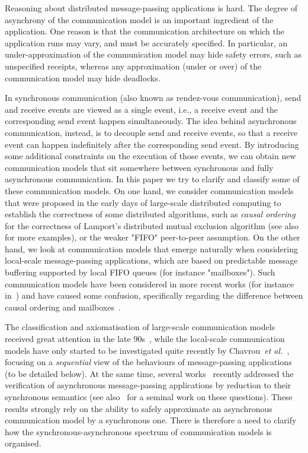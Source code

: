 

Reasoning about distributed message-passing applications is  hard. The degree of asynchrony
of the communication model is  an important ingredient of the application.
One reason
is that the communication architecture on which the application runs may vary, and must be accurately specified. 
In particular, an under-approximation of the communication model may hide safety errors,
such as unspecified receipts, whereas any approximation (under or over) of the communication model may hide deadlocks. 

In synchronous communication (also known as rendez-vous communication), send and receive events are viewed as
a single event, i.e., a receive event and the corresponding send event happen simultaneously. The idea behind asynchronous communication, instead, is to decouple send and receive events, so that a receive event can happen indefinitely after the corresponding send event. By introducing some additional constraints on the execution of those events, we can obtain new communication models that sit somewhere between synchronous and fully asynchronous communication.
In this paper we try to clarify and classify some of these communication models.
On  one hand, we consider communication models that were proposed in the early days of large-scale distributed computing to establish the correctness of some distributed algorithms, such as \emph{causal ordering}~\cite{Lamport78} for the correctness of Lamport's distributed mutual exclusion algorithm (see also~\cite{Renesse93} for more examples), or the weaker "FIFO" peer-to-peer assumption. On the other hand, we look at communication models that emerge
naturally when considering local-scale message-passing applications, which are based on predictable
message buffering supported by local FIFO queues (for instance "mailboxes"). Such communication models have
been considered in more recent works (for instance in~\cite{DBLP:journals/tcs/BasuB16}) and have caused
some confusion, specifically regarding the difference between causal ordering and mailboxes~\cite{DBLP:conf/cav/BouajjaniEJQ18,DBLP:conf/fossacs/GiustoLL20}.

The classification and axiomatisation of large-scale communication models received great attention in the late 90s~\cite{DBLP:journals/dc/Charron-BostMT96}, while the local-scale communication models have only started to be investigated quite recently by Chavrou~\emph{et al.}~\cite{DBLP:journals/fac/ChevrouHQ16}, focusing on a \emph{sequential} view of the behaviours of message-passing
applications (to be detailed below).
At the same time, several works~\cite{KraglQH18,GleissenthallKB19,DBLP:conf/cav/BouajjaniEJQ18,DBLP:conf/cav/LangeY19} recently addressed the verification of
asynchronous message-passing applications by reduction to their synchronous semantics (see also~\cite{Lipton75} for a seminal work on these questions). These results strongly rely on the ability to safely approximate an asynchronous communication model by a synchronous one. There is therefore a need to clarify how the synchronous-asynchronous spectrum of communication models is organised.

